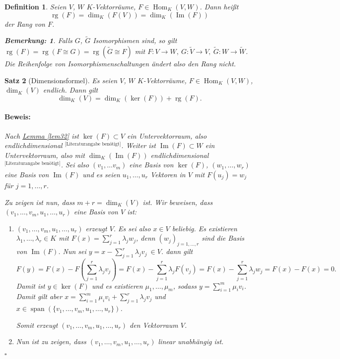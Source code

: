 \documentclass{report}
\newcommand{\lb}{\lambda}
\DeclareMathOperator{\Span}{span}
\DeclareMathOperator{\Hom}{Hom}
\DeclareMathOperator{\Ima}{Im}
\DeclareMathOperator{\rg}{rg}
\theoremstyle{customrem}
\newtheorem*{bem}{Bemerkung:}
\theoremstyle{customdef}
\newtheorem{definition}{Definition}[chapter]
\newtheorem{satz}[definition]{Satz}
\renewenvironment{proof}{\vspace{-.75cm}\paragraph{Beweis: }}{\vspace{-.5cm}\hfill$\square$}
\begin{document}
	\begin{definition}
		Seien $V$, $W$ $K$-Vektorräume, $F\in\Hom_K(V, W)$. Dann heißt $$\rg(F)=\dim_K(F(V)) = \dim_K(\Ima(F))$$ der Rang von $F$.\\
		\begin{bem}
			Falls $G$, $\tilde{G}$ Isomorphismen sind, so gilt $\rg(F) = \rg(F\cong G) = \rg(\tilde{G}\cong F)$ mit $F:V\to W,\ G:\tilde{V}\to V,\ \tilde{G}: W\to\tilde{W}$. Die Reihenfolge von Isomorphismenschaltungen ändert also den Rang nicht.\\
		\end{bem}
	\end{definition}
	
	\begin{satz}[Dimensionsformel]
		Es seien $V$, $W$ $K$-Vektorräume, $F\in\Hom_K(V, W)$, $\dim_K(V)$ endlich. Dann gilt $$\dim_K(V) = \dim_K(\ker(F))+\rg(F).$$
		\begin{proof}
			Nach \hyperref[lem32]{Lemma \ref{lem32}} ist $\ker(F)\subset V$ ein Untervektorraum, also endlichdimensional ${}^\text{[Literaturangabe benötigt]}$. Weiter ist $\Ima(F)\subset W$ ein Untervektorraum, also mit $\dim_K(\Ima(F))$ endlichdimensional ${}^\text{[Literaturangabe benötigt]}$. Sei also $(v_1, \ldots v_m)$ eine Basis von $\ker(F)$, $(w_1,\ldots, w_r)$ eine Basis von $\Ima(F)$ und es seien $u_1,\ldots, u_r$ Vektoren in $V$ mit $F(u_j)=w_j$ für $j=1, \ldots, r$.
			
			Zu zeigen ist nun, dass $m+r=\dim_K(V)$ ist. Wir beweisen, dass $(v_1, \ldots, v_m, u_1, \ldots, u_r)$ eine Basis von $V$ ist:
			\begin{enumerate}
				\item $(v_1, \ldots, v_m, u_1, \ldots, u_r)$ erzeugt $V$. Es sei also $x\in V$ beliebig. Es existieren $\lb_1, \ldots, \lb_r\in K$ mit $F(x) = \sum_{j=1}^{r}\lb_j w_j$, denn $(w_j)_{j=1, \ldots, r}$ sind die Basis von $\Ima(F)$. Nun sei $y=x-\sum_{j=1}^{r}\lb_j v_j\ \in V$. dann gilt $$F(y) = F(x) - F\left(\sum_{j=1}^{r}\lb_j v_j\right) = F(x) - \sum_{j=1}^{r}\lb_j F(v_j)= F(x) - \sum_{j=1}^{r}\lb_j w_j = F(x)-F(x)=0.$$ Damit ist $y\in \ker(F)$ und es existieren $\mu_1, \ldots, \mu_m$, sodass $y=\sum_{i=1}^{m}\mu_i v_i$. Damit gilt aber $x=\sum_{i=1}^{m}\mu_iv_i + \sum_{j=1}^{r}\lb_jv_j$ und $x\in \Span(\{v_1, \ldots, v_m, u_1, \ldots, u_r\})$. 
				
				Somit erzeugt $(v_1, \ldots, v_m, u_1, \ldots, u_r)$ den Vektorraum $V$.
				
				\item Nun ist zu zeigen, dass $(v_1, \ldots, v_m, u_1, \ldots, u_r)$ linear unabhängig ist.
				

\end{enumerate}
\end{proof}
\end{satz}
\end{document}
